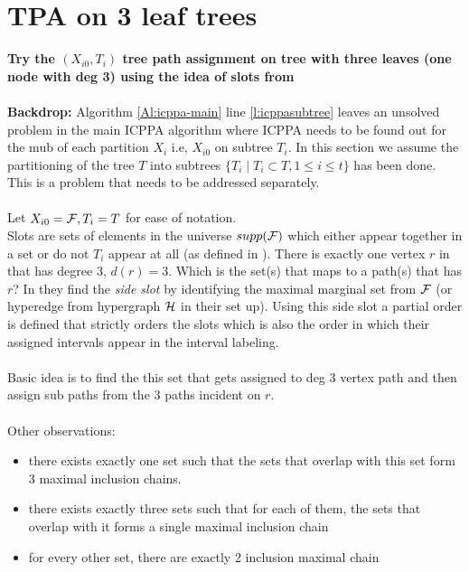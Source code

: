 \documentclass{llncs}
\def\cF{{\cal F}}
\def\cH{{\cal H}}
\begin{document}
\section{TPA on 3 leaf trees}

\noindent
{\bf Try the $(X_{i0}, T_i)$ tree path assignment on tree with three leaves
(one node with deg 3) using the idea of slots from \cite{kklv10}}\\\\

{\bf Backdrop:} Algorithm \ref{Al:icppa-main} line
\ref{l:icppasubtree} leaves an unsolved problem in the main ICPPA
algorithm where ICPPA needs to be found out for the mub of each
partition $X_i$ i.e, $X_{i0}$ on subtree $T_i$. In this section we assume the
partitioning of the tree $T$ into subtrees $\{T_i \mid T_i 
\subset T, 1 \le i \le t\}$ has been done. This is a problem that needs
to be addressed separately.\\\\

\noindent
Let $X_{i0} = \cF, T_i = T$ for ease of notation.\\
Slots are sets of elements in the universe $supp(\cF)$ which either
appear together in a set or do not $T_i$ appear at all (as defined in \cite{kklv10}).
There is exactly one vertex $r$ in that has degree 3, $d(r) = 3$. Which
is the set(s) that maps to a path(s) that has $r$? In \cite{kklv10}
they find the {\em side slot} by identifying the maximal marginal set
from $\cF$ (or hyperedge from hypergraph $\cH$ in their set up). Using
this side slot a partial order is defined that strictly orders the
slots which is also the order in which their assigned intervals appear
in the interval labeling.\\\\
Basic idea is to find the this set that gets assigned to deg 3 vertex
path and then assign sub paths from the 3 paths incident on $r$.\\\\
Other observations: 
\begin{itemize}
\item there exists exactly one set such that the sets
that overlap with this set form 3 maximal inclusion chains.
\item there exists exactly three sets such that for each of them, the
  sets that overlap with it forms a single maximal inclusion chain
\item for every other set, there are exactly 2 inclusion maximal chain
\end{itemize}
\end{document}
